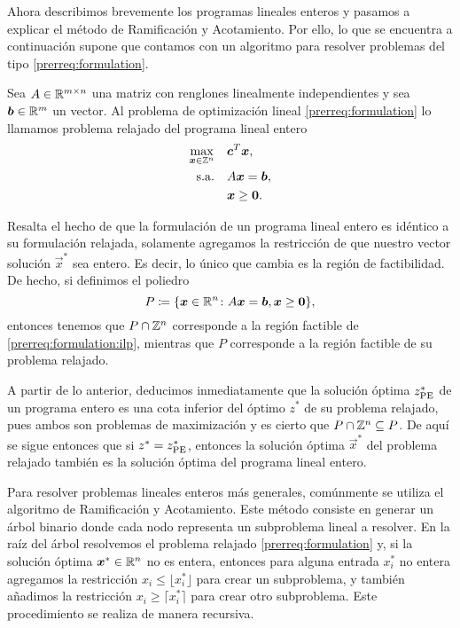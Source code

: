 Ahora describimos brevemente los programas lineales enteros y pasamos a explicar el método de
Ramificación y Acotamiento. Por ello, lo que se encuentra a continuación supone que contamos con un
algoritmo para resolver problemas del tipo \eqref{prerreq:formulation}.
\begin{definition}
	Sea $A \in \mathbb{R}^{m \times n}$ una matriz con renglones linealmente independientes y sea $\boldsymbol{b}
	\in \mathbb{R}^m$ un vector. Al problema de optimización lineal \eqref{prerreq:formulation} lo llamamos
	problema relajado del programa lineal entero
	\begin{subequations}
		\label{prerreq:formulation:ilp}
		\begin{align}
			\max_{\boldsymbol{x} \in \mathbb{Z}^n} \quad
				& \boldsymbol{c}^T\boldsymbol{x}, \label{prerreq:formulation:objective:ilp} \\
			\text{s.a.} \quad
				& A\boldsymbol{x} = \boldsymbol{b}, \label{prerreq:formulation:constraints:ilp} \\
				& \boldsymbol{x} \geq \boldsymbol{0} \nonumber.
		\end{align}
	\end{subequations}
\end{definition}
Resalta el hecho de que la formulación de un programa lineal entero es idéntico a su formulación
relajada, solamente agregamos la restricción de que nuestro vector solución $\vec{x}^*$
sea entero. Es decir, lo único que cambia es la región de factibilidad. De hecho, si
definimos el poliedro
\begin{equation*}
	P \coloneq \lbrace \boldsymbol{x} \in \mathbb{R}^n \colon A\boldsymbol{x} = \boldsymbol{b}, \boldsymbol{x} \geq \boldsymbol{0} \rbrace,
\end{equation*}
entonces tenemos que $P \cap \mathbb{Z}^n$ corresponde a la región factible de
\eqref{prerreq:formulation:ilp}, mientras que $P$ corresponde a la región factible de su problema
relajado.

A partir de lo anterior, deducimos inmediatamente que la solución óptima $z^*_{\text{PE}}$ de un programa
entero es una cota inferior del óptimo $z^*$ de su problema relajado, pues ambos son problemas de
maximización y es cierto que $P \cap \mathbb{Z}^n \subseteq P$. De aquí se sigue entonces que si $z^* =
z^*_{\text{PE}}$, entonces la solución óptima $\vec{x}^*$ del problema relajado también es la solución
óptima del programa lineal entero.

Para resolver problemas lineales enteros más generales, comúnmente se utiliza el algoritmo de
Ramificación y Acotamiento. Este método consiste en generar un árbol binario donde cada nodo
representa un subproblema lineal a resolver. En la raíz del árbol resolvemos el problema relajado
\eqref{prerreq:formulation} y, si la solución óptima $\boldsymbol{x}^* \in \mathbb{R}^n$ no es entera, entonces
para alguna entrada $x_i^*$ no entera agregamos la restricción $x_i \leq \lfloor x_i^* \rfloor$ para
crear un subproblema, y también añadimos la restricción $x_i \geq \lceil x_i^* \rceil$ para crear
otro subproblema. Este procedimiento se realiza de manera recursiva.

